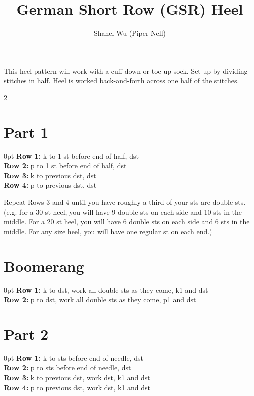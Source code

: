 \documentclass[12pt]{article}
\title{German Short Row (GSR) Heel} %
\author{Shanel Wu (Piper Nell)}
\newcommand{\rowDir}[1]{\textbf{#1:}} %
\newcommand{\blank}{\underline{\hspace{2em}} } %
\newenvironment{unframed}
    {%
	\begin{addmargin}[2em]{0pt}
	\setlength{\parindent}{-2em}}
    {%
	\setlength{\parindent}{0em}
	\end{addmargin}}
\begin{document}

{\selectfont
\HUGE\textbf{\thetitle}
}

\vspace{1em}
This heel pattern will work with a cuff-down or toe-up sock. Set up by dividing stitches in half. Heel is worked back-and-forth across one half of the stitches.

\begin{multicols}{2}
\section*{Part 1}
\begin{unframed}
\rowDir{Row 1} k to 1 st before end of half, dst \\
\rowDir{Row 2} p to 1 st before end of half, dst \\
\rowDir{Row 3} k to previous dst, dst \\
\rowDir{Row 4} p to previous dst, dst \\
\end{unframed}

Repeat Rows 3 and 4 until you have roughly a third of your sts are double sts. (e.g. for a 30 st heel, you will have 9 double sts on each side and 10 sts in the middle. For a 20 st heel, you will have 6 double sts on each side and 6 sts in the middle. For any size heel, you will have one regular st on each end.)

\vspace{-1em}

\section*{Boomerang}
\begin{unframed}
\rowDir{Row 1} k to dst, work all double sts as they come, k1 and dst \\
\rowDir{Row 2} p to dst, work all double sts as they come, p1 and dst \\
\end{unframed} 

\vspace{-1em}

\section*{Part 2}
\begin{unframed}
\rowDir{Row 1} k to \blank sts before end of needle, dst \\
\rowDir{Row 2} p to \blank sts before end of needle, dst \\
\rowDir{Row 3} k to previous dst, work dst, k1 and dst \\
\rowDir{Row 4} p to previous dst, work dst, k1 and dst
\end{unframed} \vspace{1em}


\end{multicols}
\end{document}

